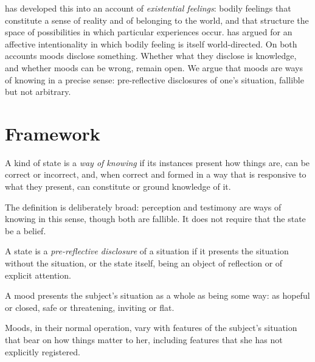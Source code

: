 \documentclass{situationist-preprint}
\begin{document}
\citet{Ratcliffe2008} has developed this into an account of \emph{existential feelings}: bodily feelings that constitute a sense of reality and of belonging to the world, and that structure the space of possibilities in which particular experiences occur. \citet{Slaby2008} has argued for an affective intentionality in which bodily feeling is itself world-directed. On both accounts moods disclose something. Whether what they disclose is knowledge, and whether moods can be wrong, remain open. We argue that moods are ways of knowing in a precise sense: pre-reflective disclosures of one's situation, fallible but not arbitrary.

\section{Framework}

\begin{definition}\label{d:wok}
A kind of state is a \emph{way of knowing} if its instances present how things are, can be correct or incorrect, and, when correct and formed in a way that is responsive to what they present, can constitute or ground knowledge of it.
\end{definition}

The definition is deliberately broad: perception and testimony are ways of knowing in this sense, though both are fallible. It does not require that the state be a belief.

\begin{definition}\label{d:pre}
A state is a \emph{pre-reflective disclosure} of a situation if it presents the situation without the situation, or the state itself, being an object of reflection or of explicit attention.
\end{definition}

\begin{principle}\label{p:pres}
A mood presents the subject's situation as a whole as being some way: as hopeful or closed, safe or threatening, inviting or flat.
\end{principle}

\begin{principle}[Responsiveness]\label{p:resp}
Moods, in their normal operation, vary with features of the subject's situation that bear on how things matter to her, including features that she has not explicitly registered.
\end{principle}
\end{document}
